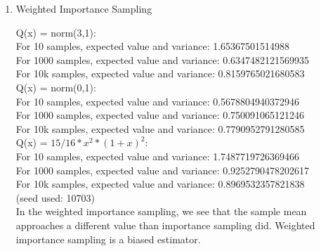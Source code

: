 \documentclass[12pt]{article}
\begin{document}
\begin{enumerate}
    \item Weighted Importance Sampling \vspace{0.3cm}\\
    \begin{tcolorbox}[fit,height=10cm, width=\textwidth, blank, borderline={1pt}{-2pt},nobeforeafter]
    Q(x) = norm(3,1):\\
For 10 samples, expected value and variance: 1.65367501514988 \\
For 1000 samples, expected value and variance: 0.6347482121569935 \\
For 10k samples, expected value and variance: 0.8159765021680583 \\
Q(x) = norm(0,1):\\
For 10 samples, expected value and variance: 0.5678804940372946 \\
For 1000 samples, expected value and variance: 0.750091065121246 \\
For 10k samples, expected value and variance: 0.7790952791280585 \\
Q(x) = $15/16*x^2*(1+x)^2$:\\
For 10 samples, expected value and variance: 1.7487719726369466 \\
For 1000 samples, expected value and variance: 0.9252790478202617 \\
For 10k samples, expected value and variance: 0.8969532357821838 \\
(seed used: 10703)\\

In the weighted importance sampling, we see that the sample mean approaches a different value than importance sampling did. Weighted importance sampling is a biased estimator.
    \end{tcolorbox}
\end{enumerate}
\newpage 
\end{document}

